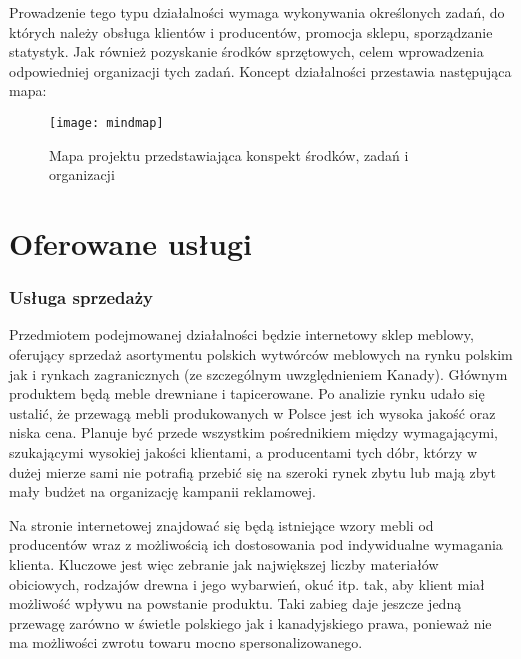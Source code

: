 		\par Prowadzenie tego typu działalności wymaga wykonywania określonych zadań, do których należy obsługa klientów i producentów, promocja sklepu, sporządzanie statystyk.  Jak również pozyskanie środków sprzętowych, celem wprowadzenia odpowiedniej organizacji tych zadań. Koncept działalności przestawia następująca mapa:
			
		\begin{figure}[H]
			\texttt{[image: mindmap]}
			\caption{Mapa projektu przedstawiająca konspekt środków, zadań i organizacji}
		\end{figure}
		
	\section{Oferowane usługi}
		\subsubsection{Usługa sprzedaży} 
			\par Przedmiotem podejmowanej działalności będzie internetowy sklep meblowy, oferujący sprzedaż asortymentu polskich wytwórców meblowych na rynku polskim jak i rynkach zagranicznych (ze szczególnym uwzględnieniem Kanady). Głównym produktem będą meble drewniane i tapicerowane. Po analizie rynku udało się ustalić, że przewagą mebli produkowanych w Polsce jest ich wysoka jakość oraz niska cena. Planuje być przede wszystkim pośrednikiem między wymagającymi, szukającymi wysokiej jakości klientami, a producentami tych dóbr, którzy w dużej mierze sami nie potrafią przebić się na szeroki rynek zbytu lub mają zbyt mały budżet na organizację kampanii reklamowej.
				
			\par Na stronie internetowej znajdować się będą istniejące wzory mebli od producentów wraz z możliwością ich dostosowania pod indywidualne wymagania klienta. Kluczowe jest więc zebranie jak największej liczby materiałów obiciowych, rodzajów drewna i jego wybarwień, okuć itp. tak, aby klient miał możliwość wpływu na powstanie produktu. Taki zabieg daje jeszcze jedną przewagę zarówno w świetle polskiego jak i kanadyjskiego prawa, ponieważ nie ma możliwości zwrotu towaru mocno spersonalizowanego.
				
